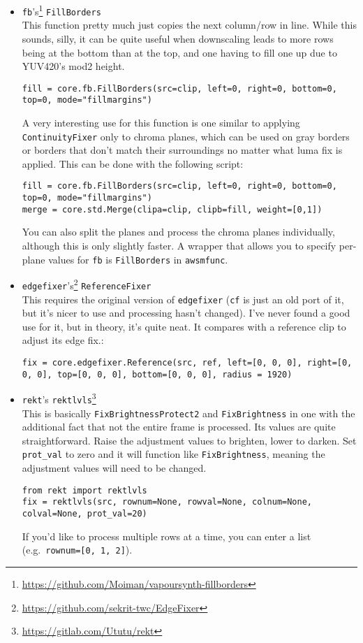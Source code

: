 \documentclass{scrartcl}
\begin{document}
\begin{itemize}
\texttt{thresh} specifies how far the result can vary from the input. This means that the lower this is, the better.  \texttt{blur} is the strength of the filter, with lower values being stronger, and larger values being less aggressive.  If you set \texttt{blur=1}, you're basically copying rows.
\item \texttt{fb}'s\footnote{\url{https://github.com/Moiman/vapoursynth-fillborders}} \texttt{FillBorders}\\
This function pretty much just copies the next column/row in line.  While this sounds, silly, it can be quite useful when downscaling leads to more rows being at the bottom than at the top, and one having to fill one up due to YUV420's mod2 height.
\begin{lstlisting}
fill = core.fb.FillBorders(src=clip, left=0, right=0, bottom=0, top=0, mode="fillmargins")
\end{lstlisting}
A very interesting use for this function is one similar to applying \texttt{ContinuityFixer} only to chroma planes, which can be used on gray borders or borders that don't match their surroundings no matter what luma fix is applied.  This can be done with the following script:
\begin{lstlisting}
fill = core.fb.FillBorders(src=clip, left=0, right=0, bottom=0, top=0, mode="fillmargins")
merge = core.std.Merge(clipa=clip, clipb=fill, weight=[0,1])
\end{lstlisting}
You can also split the planes and process the chroma planes individually, although this is only slightly faster. A wrapper that allows you to specify per-plane values for \texttt{fb} is \texttt{FillBorders} in \texttt{awsmfunc}.
\item \texttt{edgefixer}'s\footnote{\url{https://github.com/sekrit-twc/EdgeFixer}} \texttt{ReferenceFixer}\\
This requires the original version of \texttt{edgefixer} (\texttt{cf} is just an old port of it, but it's nicer to use and processing hasn't changed).  I've never found a good use for it, but in theory, it's quite neat.  It compares with a reference clip to adjust its edge fix.:
\begin{lstlisting}
fix = core.edgefixer.Reference(src, ref, left=[0, 0, 0], right=[0, 0, 0], top=[0, 0, 0], bottom=[0, 0, 0], radius = 1920)
\end{lstlisting}
\item \texttt{rekt}'s \texttt{rektlvls}\footnote{\url{https://gitlab.com/Ututu/rekt}}\\
This is basically \texttt{FixBrightnessProtect2} and \texttt{FixBrightness} in one with the additional fact that not the entire frame is processed.  Its values are quite straightforward.  Raise the adjustment values to brighten, lower to darken.  Set \texttt{prot\_val} to zero and it will function like \texttt{FixBrightness}, meaning the adjustment values will need to be changed.
\begin{lstlisting}
from rekt import rektlvls
fix = rektlvls(src, rownum=None, rowval=None, colnum=None, colval=None, prot_val=20)
\end{lstlisting}
If you'd like to process multiple rows at a time, you can enter a list (e.g.\ \texttt{rownum=[0, 1, 2]}).
\end{itemize}
\end{document}
